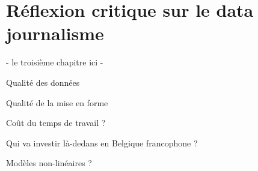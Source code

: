 
\chapter{Réflexion critique sur le data journalisme}

- le troisième chapitre ici -

Qualité des données

Qualité de la mise en forme

Coût du temps de travail ?

Qui va investir là-dedans en Belgique francophone ?

Modèles non-linéaires ?
